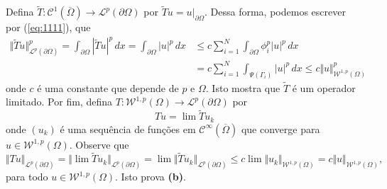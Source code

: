 \documentclass[a4paper, 11pt]{book}
\theoremstyle{definition}
\newcommand{\cC}{\mathcal{C}}
\newcommand{\cL}{\mathcal{L}}
\newcommand{\cW}{\mathcal{W}}
\begin{document}
\begin{prf}
    Defina $\widetilde T : \cC^1(\overline \Omega) \to \cL^p(\partial\Omega)$ por $\widetilde T u = u |_{\partial \Omega}$.
    Dessa forma, podemos escrever por (\ref{eq:1111}), que
    \begin{equation} \label{eq:2222}
        \begin{aligned}
            \Vert \widetilde Tu \Vert_{\cL^p(\partial \Omega)}^p = \int_{\partial\Omega} | \widetilde T u|^p \,dx = \int_{\partial\Omega} |u|^p \,dx &\leqslant c \sum_{i=1}^{N} \int_{\partial \Omega} \phi_i^p |u|^p \,dx\\ 
            &= c \sum_{i=1}^N \int_{\Psi(\Gamma_i)} |u|^p \,dx \leqslant c\Vert u \Vert_{\cW^{1,p}(\Omega)}^p
        \end{aligned}
    \end{equation}
    onde $c$ é uma constante que depende de $p$ e $\Omega$. Isto mostra que $\widetilde T$ é um operador limitado.
    Por fim, defina $T : \cW^{1,p}(\Omega) \to \cL^p(\partial \Omega)$ por
    \[
        T u = \lim \widetilde T u_k
    \]
    onde $(u_k)$ é uma sequência de funções em $\cC^{\infty}(\overline\Omega)$ que converge para $u \in \cW^{1,p}(\Omega)$. 
    Observe que
    \[
        \Vert Tu \Vert_{\cL^p(\partial \Omega)} = \Vert \lim \widetilde T u_k \Vert_{\cL^p(\partial \Omega)} = \lim \Vert \widetilde T u_k \Vert_{\cL^p(\partial \Omega)} \leqslant c \lim \Vert u_k \Vert_{\cW^{1,p}(\Omega)} = c \Vert u \Vert_{\cW^{1,p}(\Omega)},
    \]
    para todo $u \in \cW^{1,p}(\Omega)$. Isto prova \textbf{(b)}.
\end{prf}
\end{document}

